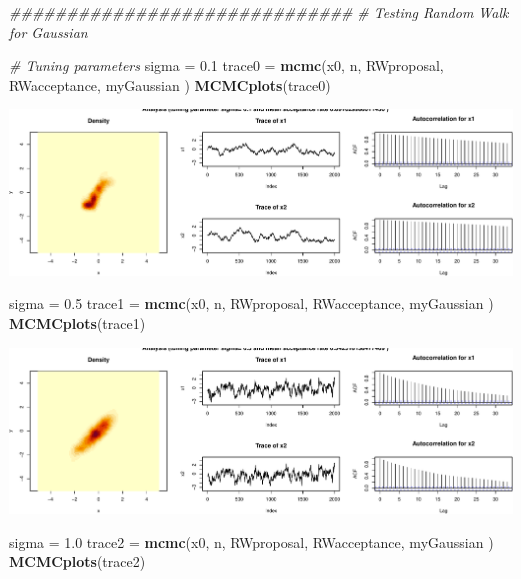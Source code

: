 \documentclass[
]{article}
\newenvironment{Shaded}{\begin{snugshade}}{\end{snugshade}}
\newcommand{\CommentTok}[1]{\textcolor[rgb]{0.56,0.35,0.01}{\textit{#1}}}
\newcommand{\FloatTok}[1]{\textcolor[rgb]{0.00,0.00,0.81}{#1}}
\newcommand{\KeywordTok}[1]{\textcolor[rgb]{0.13,0.29,0.53}{\textbf{#1}}}
\newcommand{\NormalTok}[1]{#1}
\newcommand{\StringTok}[1]{\textcolor[rgb]{0.31,0.60,0.02}{#1}}
\begin{document}
\begin{Shaded}
\begin{Highlighting}[]
\CommentTok{##############################}
\CommentTok{# Testing Random Walk for Gaussian}

\CommentTok{# Tuning parameters}
\NormalTok{sigma =}\StringTok{ }\FloatTok{0.1}
\NormalTok{trace0 =}\StringTok{ }\KeywordTok{mcmc}\NormalTok{(x0, n, RWproposal, RWacceptance, myGaussian )}
\KeywordTok{MCMCplots}\NormalTok{(trace0)}
\end{Highlighting}
\end{Shaded}

\includegraphics{Project1_files/figure-latex/RandomWalk1-1.pdf}

\begin{Shaded}
\begin{Highlighting}[]
\NormalTok{sigma =}\StringTok{ }\FloatTok{0.5} 
\NormalTok{trace1 =}\StringTok{ }\KeywordTok{mcmc}\NormalTok{(x0, n, RWproposal, RWacceptance, myGaussian )}
\KeywordTok{MCMCplots}\NormalTok{(trace1)}
\end{Highlighting}
\end{Shaded}

\includegraphics{Project1_files/figure-latex/RandomWalk1-2.pdf}

\begin{Shaded}
\begin{Highlighting}[]
\NormalTok{sigma =}\StringTok{ }\FloatTok{1.0}
\NormalTok{trace2 =}\StringTok{ }\KeywordTok{mcmc}\NormalTok{(x0, n, RWproposal, RWacceptance, myGaussian )}
\KeywordTok{MCMCplots}\NormalTok{(trace2)}
\end{Highlighting}
\end{Shaded}
\end{document}
